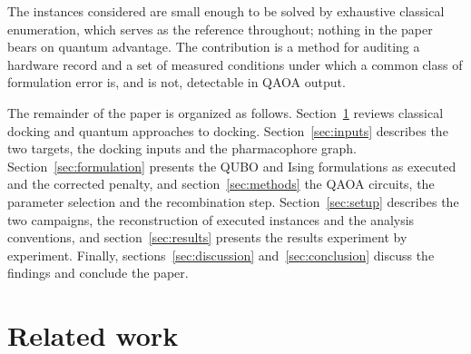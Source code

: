 \documentclass{iopjournal}
\begin{document}
The instances considered are small enough to be solved by exhaustive classical enumeration, which serves as the reference throughout; nothing in the paper bears on quantum advantage. The contribution is a method for auditing a hardware record and a set of measured conditions under which a common class of formulation error is, and is not, detectable in QAOA output.

The remainder of the paper is organized as follows. Section~\ref{sec:related} reviews classical docking and quantum approaches to docking. Section~\ref{sec:inputs} describes the two targets, the docking inputs and the pharmacophore graph. Section~\ref{sec:formulation} presents the QUBO and Ising formulations as executed and the corrected penalty, and section~\ref{sec:methods} the QAOA circuits, the parameter selection and the recombination step. Section~\ref{sec:setup} describes the two campaigns, the reconstruction of executed instances and the analysis conventions, and section~\ref{sec:results} presents the results experiment by experiment. Finally, sections~\ref{sec:discussion} and~\ref{sec:conclusion} discuss the findings and conclude the paper.

\section{Related work}
\label{sec:related}
\end{document}
